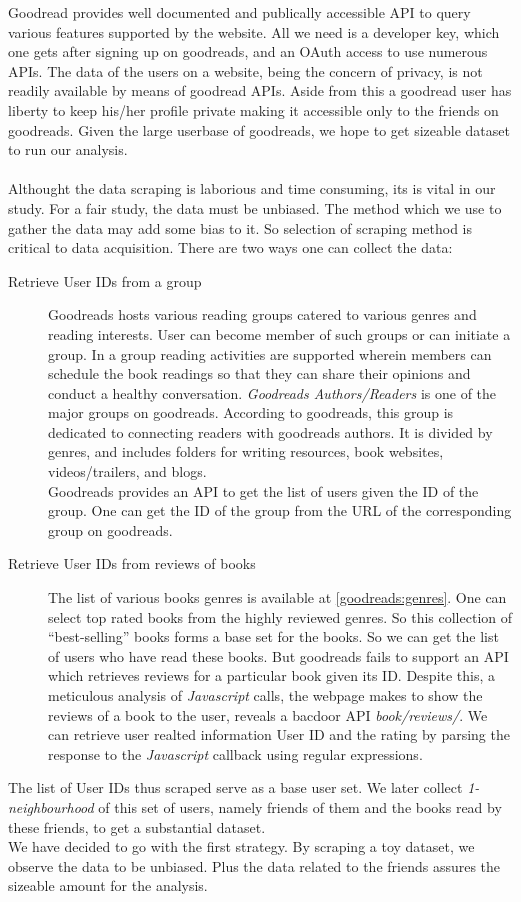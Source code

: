 \documentclass[11pt]{article}
\begin{document}
Goodread provides well documented and publically accessible API to query various features supported by the website. All we need is a developer key, which one gets after signing up on goodreads, and an OAuth access to use numerous APIs. The data of the users on a website, being the concern of privacy, is not readily available by means of goodread APIs. Aside from this a goodread user has liberty to keep his/her profile private making it accessible only to the friends on goodreads. Given the large userbase of goodreads, we hope to get sizeable dataset to run our analysis.\\\\
Althought the data scraping is laborious and time consuming, its is vital in our study. For a fair study, the data must be unbiased. The method which we use to gather the data may add some bias to it. So selection of scraping method is critical to data acquisition. There are two ways one can collect the data:
\begin{description}
\item[Retrieve User IDs from a group]
Goodreads hosts various reading groups catered to various genres and reading interests. User can become member of such groups or can initiate a group. In a group reading activities are supported wherein members can schedule the book readings so that they can share their opinions and conduct a healthy conversation. {\it Goodreads Authors/Readers} is one of the major groups on goodreads.  According to goodreads, this group is dedicated to connecting readers with goodreads authors. It is divided by genres, and includes folders for writing resources, book websites, videos/trailers, and blogs. \\
Goodreads provides an API to get the list of users given the ID of the group. One can get the ID of the group from the URL of the corresponding group on goodreads.
\item[Retrieve User IDs from reviews of books]
The list of various books genres is available at \ref{goodreads:genres}. One can select top rated books from the highly reviewed genres. So this collection of ``best-selling'' books forms a base set for the books. So we can get the list of users who have read these books. But goodreads fails to support an API which retrieves reviews for a particular book given its ID. Despite this, a meticulous analysis of \textit{Javascript} calls, the webpage makes to show the reviews of a book to the user, reveals a bacdoor API \textit{book/reviews/}. We can retrieve user realted information User ID and the rating by parsing the response to the \textit{Javascript} callback using regular expressions.
\end{description}
The list of User IDs thus scraped serve as a base user set. We later collect {\it 1-neighbourhood} of this set of users, namely friends of them and the books read by these friends, to get a substantial dataset.  \\
We have decided to go with the first strategy. By scraping a toy dataset, we observe the data to be unbiased. Plus the data related to the friends assures the sizeable amount for the analysis.
\end{document}
